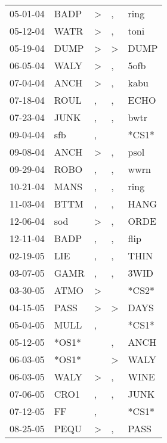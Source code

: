 \begin{supertabular}{lllll}
 05-01-04 &   BADP &     \textgreater &             , &   ring \\
 05-12-04 &   WATR &     \textgreater &             , &   toni \\
 05-19-04 &   DUMP &     \textgreater &  \textgreater &   DUMP \\
 06-05-04 &   WALY &     \textgreater &             , &   5ofb \\
 07-04-04 &   ANCH &     \textgreater &             , &   kabu \\
 07-18-04 &   ROUL &                , &             , &   ECHO \\
 07-23-04 &   JUNK &                , &             , &   bwtr \\
 09-04-04 &    sfb &                , &               &  *CS1* \\
 09-08-04 &   ANCH &     \textgreater &             , &   psol \\
 09-29-04 &   ROBO &                , &             , &   wwrn \\
 10-21-04 &   MANS &                , &             , &   ring \\
 11-03-04 &   BTTM &                , &             , &   HANG \\
 12-06-04 &    sod &     \textgreater &             , &   ORDE \\
 12-11-04 &   BADP &                , &             , &   flip \\
 02-19-05 &    LIE &                , &             , &   THIN \\
 03-07-05 &   GAMR &                , &             , &   3WID \\
 03-30-05 &   ATMO &     \textgreater &               &  *CS2* \\
 04-15-05 &   PASS &     \textgreater &  \textgreater &   DAYS \\
 05-04-05 &   MULL &                , &               &  *CS1* \\
 05-12-05 &  *OS1* &                  &             , &   ANCH \\
 06-03-05 &  *OS1* &                  &  \textgreater &   WALY \\
 06-03-05 &   WALY &     \textgreater &             , &   WINE \\
 07-06-05 &   CRO1 &                , &             , &   JUNK \\
 07-12-05 &     FF &                , &               &  *CS1* \\
 08-25-05 &   PEQU &     \textgreater &             , &   PASS \\

\end{supertabular}
